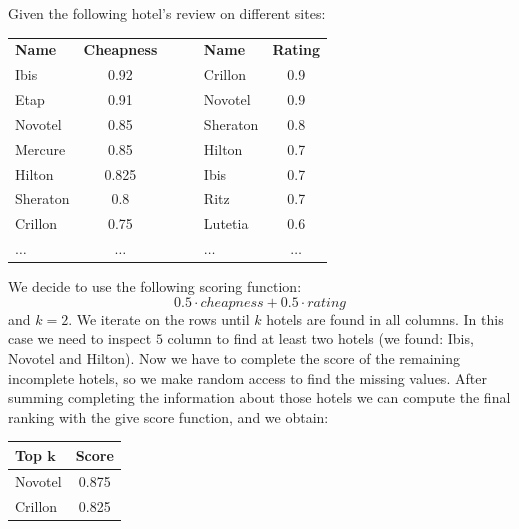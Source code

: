 \documentclass[12pt, a4paper]{report}
\begin{document}
    \begin{example}
        Given the following hotel's review on different sites: 
        \begin{table}[H]
            \centering
            \begin{tabular}{|lc|c|lc|}
            \cline{1-2} \cline{4-5}
            \textbf{Name} & \textbf{Cheapness} & $\:\:\:\:\:\:$ & \textbf{Name} & \textbf{Rating} \\ \cline{1-2} \cline{4-5} 
            Ibis          & 0.92               &                & Crillon       & 0.9             \\ 
            Etap          & 0.91               &                & Novotel       & 0.9             \\  
            Novotel       & 0.85               &                & Sheraton      & 0.8             \\  
            Mercure       & 0.85               &                & Hilton        & 0.7             \\  
            Hilton        & 0.825              &                & Ibis          & 0.7             \\  
            Sheraton      & 0.8                &                & Ritz          & 0.7             \\  
            Crillon       & 0.75               &                & Lutetia       & 0.6             \\  
            $\dots$       & $\dots$            &                & $\dots$       & $\dots$         \\ \cline{1-2} \cline{4-5} 
            \end{tabular}
        \end{table}
        We decide to use the following scoring function: 
        \[0.5 \cdot cheapness+0.5 \cdot rating\]
        and $k=2$. We iterate on the rows until $k$ hotels are found in all columns. In this case we need to inspect $5$ column to find at
        least two hotels (we found: Ibis, Novotel and Hilton). Now we have to complete the score of the remaining incomplete hotels, so we make 
        random access to find the missing values. After summing completing the information about those hotels we can compute the final ranking 
        with the give score function, and we obtain: 
        \begin{table}[H]
            \centering
            \begin{tabular}{|lc|}
            \hline
            \textbf{Top $\boldsymbol{k}$} & \textbf{Score} \\ \hline
            Novotel                       & 0.875          \\ 
            Crillon                       & 0.825          \\ \hline
            \end{tabular}
        \end{table}
    \end{example}
\end{document}
